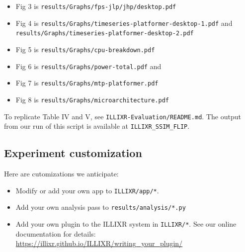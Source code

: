 \documentclass{sigplanconf}
\begin{document}
\begin{itemize}
\item Fig 3 is {\footnotesize\texttt{results/Graphs/fps-jlp/jhp/desktop.pdf}}
\item Fig 4 is {\footnotesize\texttt{results/Graphs/timeseries-platformer-desktop-1.pdf}} and {\footnotesize\texttt{results/Graphs/timeseries-platformer-desktop-2.pdf}}
\item Fig 5 is {\footnotesize\texttt{results/Graphs/cpu-breakdown.pdf}}
\item Fig 6 is {\footnotesize\texttt{results/Graphs/power-total.pdf}} and
\item Fig 7 is {\footnotesize\texttt{results/Graphs/mtp-platformer.pdf}}
\item Fig 8 is {\footnotesize\texttt{results/Graphs/microarchitecture.pdf}}
\end{itemize}

To replicate Table IV and V, see \texttt{ILLIXR-Evaluation/README.md}. The output from our run of this script is available at \texttt{ILLIXR\_SSIM\_FLIP}.

\subsection{Experiment customization}

Here are cutomizations we anticipate:

\begin{itemize}
\item Modify or add your own app to \texttt{ILLIXR/app/*}.
\item Add your own analysis pass to \texttt{results/analysis/*.py}
\item Add your own plugin to the ILLIXR system in \texttt{ILLIXR/*}. See our online documentation for details:\newline
{\footnotesize \url{https://illixr.github.io/ILLIXR/writing_your_plugin/}}
\end{itemize}

\eject
\end{document}
